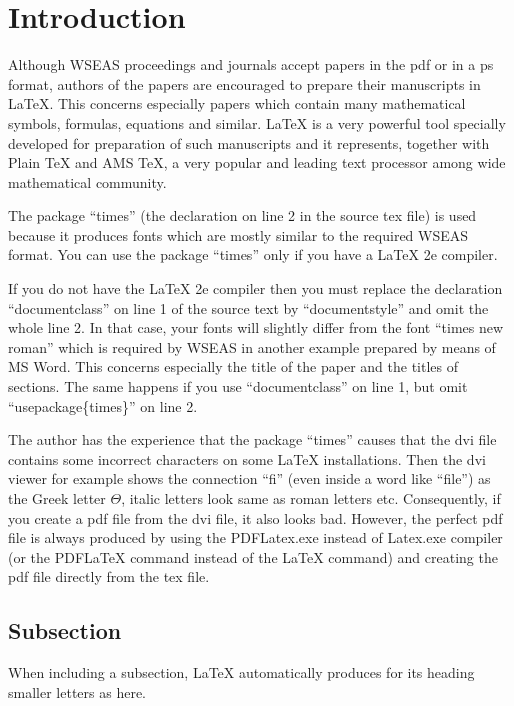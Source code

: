 \documentclass[twocolumn,11pt]{article}
\begin{document}
\section{Introduction}
\label{S1} \vspace{-4pt}

Although WSEAS proceedings and journals accept papers in the pdf
or in a ps format, authors of the papers are encouraged to prepare
their manuscripts in LaTeX. This concerns especially papers which
contain many mathematical symbols, formulas, equations and
similar. LaTeX is a very powerful tool specially developed for
preparation of such manuscripts and it represents, together with
Plain TeX and AMS TeX, a very popular and leading text processor
among wide mathematical community.

The package ``times'' (the declaration on line 2 in the source tex
file) is used because it produces fonts which are mostly similar
to the required WSEAS format. You can use the package ``times''
only if you have a LaTeX 2e compiler.

If you do not have the LaTeX 2e compiler then you must replace the
declaration ``documentclass'' on line 1 of the source text by
``documentstyle'' and omit the whole line 2. In that case, your
fonts will slightly differ from the font ``times new roman'' which
is required by WSEAS in another example prepared by means of MS
Word. This concerns especially the title of the paper and the
titles of sections. The same happens if you use ``documentclass''
on line 1, but omit ``usepackage\{times\}'' on line 2.

The author has the experience that the package ``times'' causes
that the dvi file contains some incorrect characters on some LaTeX
installations. Then the dvi viewer for example shows the
connection ``fi'' (even inside a word like ``file'') as the Greek
letter $\Theta$, italic letters look same as roman letters etc.
Consequently, if you create a pdf file from the dvi file, it also
looks bad. However, the perfect pdf file is always produced by
using the PDFLatex.exe instead of Latex.exe compiler (or the
PDFLaTeX command instead of the LaTeX command) and creating the
pdf file directly from the tex file.

\subsection{Subsection}
\vspace{-4pt}

When including a subsection, LaTeX automatically produces for its
heading smaller letters as here.
\end{document}
